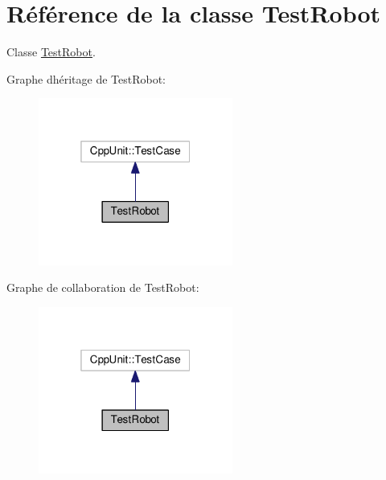 \hypertarget{classTestRobot}{}\section{Référence de la classe Test\+Robot}
\label{classTestRobot}


Classe \hyperlink{classTestRobot}{Test\+Robot}.  




Graphe d\textquotesingle{}héritage de Test\+Robot\+:
\nopagebreak
\begin{figure}[H]
\begin{center}
\leavevmode
\includegraphics[width=181pt]{classTestRobot__inherit__graph}
\end{center}
\end{figure}


Graphe de collaboration de Test\+Robot\+:
\nopagebreak
\begin{figure}[H]
\begin{center}
\leavevmode
\includegraphics[width=181pt]{classTestRobot__coll__graph}
\end{center}
\end{figure}
